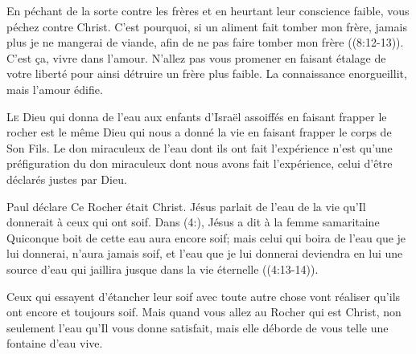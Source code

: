 \Og En péchant de la sorte contre les frères
 et en heurtant leur conscience faible,
 vous péchez contre Christ.
 C'est pourquoi, si un aliment fait tomber mon frère,
 jamais plus je ne mangerai de viande,
 afin de ne pas faire tomber mon frère \Fg{}
 ((8:12-13)).
 C'est \c{c}a, vivre dans l'amour.
 N'allez pas vous promener en faisant étalage
 de votre liberté pour ainsi détruire un frère plus faible.
 La connaissance enorgueillit, mais l'amour édifie.

\dvrule







\lettrine{L}{e} Dieu qui donna de l'eau aux enfants d'Israël
 assoiffés en faisant frapper le rocher
 est le même Dieu qui nous a donné la vie
 en faisant frapper le corps de Son Fils.
 Le don miraculeux de l'eau dont ils ont fait l'expérience
 n'est qu'une préfiguration du don miraculeux
 dont nous avons fait l'expérience,
 celui d'être déclarés justes par Dieu.


Paul déclare\frcolon{}
 \Og Ce Rocher était Christ. \Fg{}
 Jésus parlait de l'eau de la vie qu'Il donnerait
 à ceux qui ont soif. Dans (4:),
 Jésus a dit à la femme samaritaine\frcolon{}
 \Og Quiconque boit de cette eau aura encore soif;
 mais celui qui boira de l'eau que je lui donnerai,
 n'aura jamais soif, et l'eau que je lui donnerai
 deviendra en lui une source d'eau qui jaillira
 jusque dans la vie éternelle \Fg{}
 ((4:13-14)).

Ceux qui essayent d'étancher leur soif
 avec toute autre chose vont réaliser qu'ils ont encore et toujours soif.
 Mais quand vous allez au Rocher qui est Christ,
 non seulement l'eau qu'Il vous donne satisfait,
 mais elle déborde de vous telle une fontaine d'eau vive.

